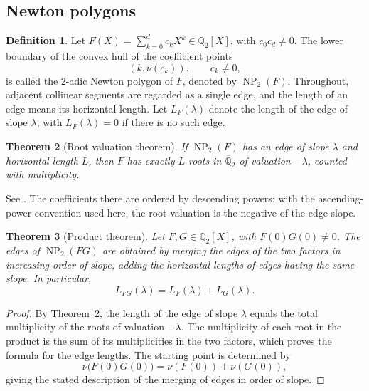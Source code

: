 \documentclass[11pt,a4paper]{article}
\numberwithin{equation}{section}
\newtheorem{theorem}{Theorem}[section]
\theoremstyle{definition}
\newtheorem{definition}[theorem]{Definition}
\begin{document}
\subsection{Newton polygons}

\begin{definition}\label{def:2-1}
Let $F(X)=\sum_{k=0}^d c_kX^k\in\mathbb{Q}_2[X]$, with $c_0c_d\ne0$.
The lower boundary of the convex hull of the coefficient points
\[
 (k,\nu(c_k)),\qquad c_k\ne0,
\]
is called the $2$-adic Newton polygon of $F$, denoted by
$\operatorname{NP}_2(F)$. Throughout, adjacent collinear segments are
regarded as a single edge, and the length of an edge means its horizontal
length. Let $L_F(\lambda)$ denote the length of the edge of slope
$\lambda$, with $L_F(\lambda)=0$ if there is no such edge.
\end{definition}

\begin{theorem}[Root valuation theorem]\label{thm:2-2}
If $\operatorname{NP}_2(F)$ has an edge of slope $\lambda$ and horizontal
length $L$, then $F$ has exactly $L$ roots in $\overline{\mathbb{Q}}_2$
of valuation $-\lambda$, counted with multiplicity.
\end{theorem}

See \cite[Proposition~7.44, pp.~125--126]{Milne}. The coefficients there
are ordered by descending powers; with the ascending-power convention
used here, the root valuation is the negative of the edge slope.

\begin{theorem}[Product theorem]\label{thm:2-3}
Let $F,G\in\mathbb{Q}_2[X]$, with $F(0)G(0)\ne0$. The edges of
$\operatorname{NP}_2(FG)$ are obtained by merging the edges of the two
factors in increasing order of slope, adding the horizontal lengths
of edges having the same slope. In particular,
\[
 L_{FG}(\lambda)=L_F(\lambda)+L_G(\lambda).
\]
\end{theorem}

\begin{proof}
By Theorem~\ref{thm:2-2}, the length of the edge of slope $\lambda$
equals the total multiplicity of the roots of valuation $-\lambda$.
The multiplicity of each root in the product is the sum of its
multiplicities in the two factors, which proves the formula for the
edge lengths. The starting point is determined by
\[
 \nu\bigl(F(0)G(0)\bigr)=\nu(F(0))+\nu(G(0)),
\]
giving the stated description of the merging of edges in order of slope.
\end{proof}
\end{document}

